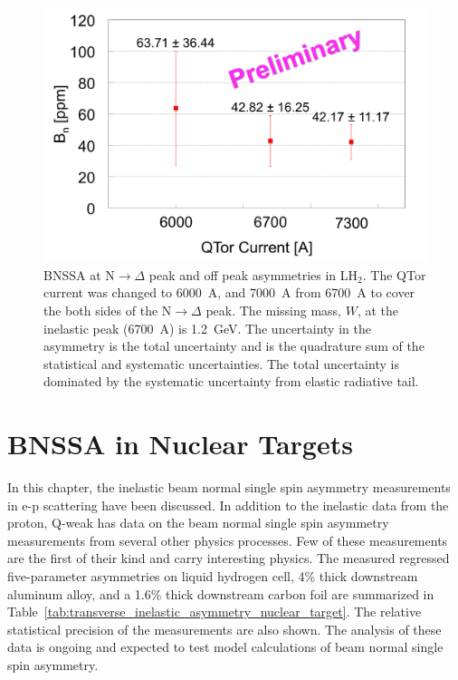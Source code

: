 \begin{figure}[!h]
	\begin{center}
	\includegraphics[width=15.0cm]{figures/asymmetryLH2_vs_QTor}
	\end{center}
	\caption
	{BNSSA at N$\rightarrow\Delta$ peak and off peak asymmetries in LH$_{2}$. The QTor current was changed to 6000~A, and 7000~A from 6700~A to cover the both sides of the N$\rightarrow\Delta$ peak. The missing mass, $W$, at the inelastic peak (6700~A) is 1.2~GeV. The uncertainty in the asymmetry is the total uncertainty and is the quadrature sum of the statistical and systematic uncertainties. The total uncertainty is dominated by the systematic uncertainty from elastic radiative tail.}
	\label{fig:asymmetryLH2_vs_QTor}
\end{figure}




\section{BNSSA in Nuclear Targets}
\label{BNSSA in Nuclear Targets}

In this chapter, the inelastic beam normal single spin asymmetry measurements in e-p scattering have been discussed. In addition to the inelastic data from the proton, Q-weak has data on the beam normal single spin asymmetry measurements from several other physics processes. Few of these measurements are the first of their kind and carry interesting physics. The measured regressed five-parameter asymmetries on liquid hydrogen cell, 4\% thick downstream aluminum alloy, and a 1.6\% thick downstream carbon foil are summarized in Table~\ref{tab:transverse_inelastic_asymmetry_nuclear_target}. The relative statistical precision of the measurements are also shown. The analysis of these data is ongoing and expected to test model calculations of beam normal single spin asymmetry.


